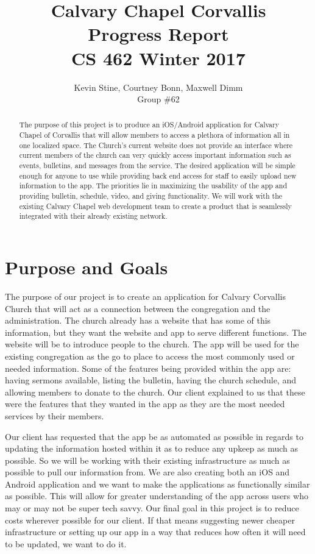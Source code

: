 \documentclass[letterpaper,10pt,draftclsnofoot,onecolumn,titlepage]{IEEEtran}
\def\name{Kevin Stine, Courtney Bonn, Maxwell Dimm}
\def\team{Calvary Chapel Corvallis}
\def\grp{Group \#62}
\begin{document}
	\title{\huge \team \\ Progress Report\\ CS 462 Winter 2017}
	\author{\large \name \\ \grp}



	\maketitle

		\begin{abstract}The purpose of this project is to produce an iOS/Android application for Calvary Chapel of Corvallis that will allow members to access a plethora of information all in one localized space.
		The Church's current website does not provide an interface where current members of the church can very quickly access important information such as events, bulletins, and messages from the service.
		The desired application will be simple enough for anyone to use while providing back end access for staff to easily upload new information to the app.
		The priorities lie in maximizing the usability of the app and providing bulletin, schedule, video, and giving functionality.
		We will work with the existing Calvary Chapel web development team to create a product that is seamlessly integrated with their already existing network.
		\end{abstract}

		\clearpage

		\section{Purpose and Goals}
		The purpose of our project is to create an application for Calvary Corvallis Church that will act as a connection between the congregation and the administration.
		The church already has a website that has some of this information, but they want the website and app to serve different functions.
		The website will be to introduce people to the church.
		The app will be used for the existing congregation as the go to place to access the most commonly used or needed information.
		Some of the features being provided within the app are: having sermons available, listing the bulletin, having the church schedule, and allowing members to donate to the church.
		Our client explained to us that these were the features that they wanted in the app as they are the most needed services by their members.

		Our client has requested that the app be as automated as possible in regards to updating the information hosted within it as to reduce any upkeep as much as possible.
		So we will be working with their existing infrastructure as much as possible to pull our information from.
		We are also creating both an iOS and Android application and we want to make the applications as functionally similar as possible.
		This will allow for greater understanding of the app across users who may or may not be super tech savvy.
		Our final goal in this project is to reduce costs wherever possible for our client.
		If that means suggesting newer cheaper infrastructure or setting up our app in a way that reduces how often it will need to be updated, we want to do it.
\end{document}
